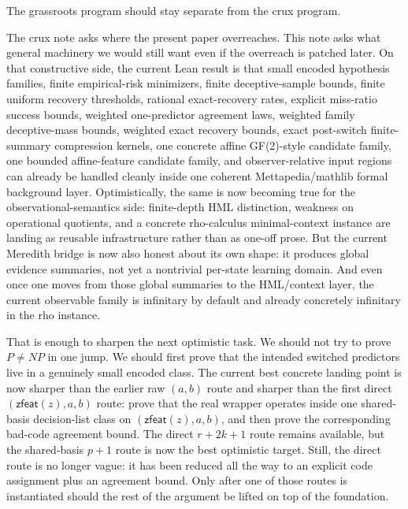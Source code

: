\documentclass[11pt]{article}
\theoremstyle{remark}
\begin{document}
The grassroots program should stay separate from the crux program.

The crux note asks where the present paper overreaches.  This note asks what
general machinery we would still want even if the overreach is patched later.
On that constructive side, the current Lean result is that small encoded
hypothesis families, finite empirical-risk minimizers, finite deceptive-sample
bounds, finite uniform recovery thresholds, rational exact-recovery rates,
explicit miss-ratio success bounds, weighted one-predictor agreement laws,
weighted family deceptive-mass bounds, weighted exact recovery bounds, exact
post-switch finite-summary compression kernels, one concrete affine GF(2)-style
candidate family, one bounded affine-feature candidate family, and
observer-relative input regions can already be handled cleanly inside one
coherent Mettapedia/mathlib formal background layer.  Optimistically, the same is
now becoming true for the observational-semantics side: finite-depth HML
distinction, weakness on operational quotients, and a concrete rho-calculus
minimal-context instance are landing as reusable infrastructure rather than as
one-off prose.  But the current Meredith bridge is now also honest about its own
shape: it produces global evidence summaries, not yet a nontrivial per-state
learning domain.  And even once one moves from those global summaries to the
HML/context layer, the current observable family is infinitary by default and
already concretely infinitary in the rho instance.

That is enough to sharpen the next optimistic task.  We should not try to prove
\(P \neq NP\) in one jump.  We should first prove that the intended switched
predictors live in a genuinely small encoded class.  The current best concrete
landing point is now sharper than the earlier raw \((a,b)\) route and sharper
than the first direct \((\mathsf{zfeat}(z),a,b)\) route: prove that the real
wrapper operates inside one shared-basis decision-list class on
\((\mathsf{zfeat}(z),a,b)\), and then prove the corresponding bad-code
agreement bound.  The direct \(r+2k+1\) route remains available, but the
shared-basis \(p+1\) route is now the best optimistic target.  Still, the
direct route is no longer vague: it has been reduced all the way to an explicit
code assignment plus an agreement bound.  Only after one of those routes is
instantiated should the rest of the argument be lifted on top of the
foundation.
\end{document}
